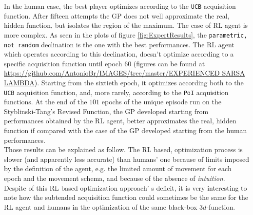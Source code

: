 In the human case, the best player optimizes according to the {\tt UCB} acquisition function. After fifteen attempts the GP does not well approximate the real, hidden function, but isolates the region of the maximum. The case of RL agent is more complex. As seen in the plots of figure \ref{fig:ExpertResults}, the {\tt parametric, not random} declination is the one with the best performances. The RL agent which operates according to this declination, doesn't optimize according to a specific acquisition function until epoch $60$ (figures can be found at \url{https://github.com/AntonioBr/IMAGES/tree/master/EXPERIENCED SARSA LAMBDA}). Starting from the sixtieth epoch, it optimizes according both to the {\tt UCB} acquisition function, and, more rarely, according to the {\tt PoI} acquisition functions. At the end of the $101$ epochs of the unique episode run on the Styblinski-Tang's Revised Function, the GP developed starting from performances obtained by the RL agent, better approximates the real, hidden function if compared with the case of the GP developed starting from the human performances. \\

Those results can be explained as follow. The RL based, optimization process is slower (and apparently less accurate) than humans' one because of limits imposed by the definition of the agent, e.g. the limited amount of movement for each epoch and the movement schema, and because of the absence of \textit{intuition}. Despite of this RL based optimization approach' s deficit, it is very interesting to note how the subtended acquisition function could sometimes be the same for the RL agent and humans in the optimization of the same black-box $3d$-function. 



